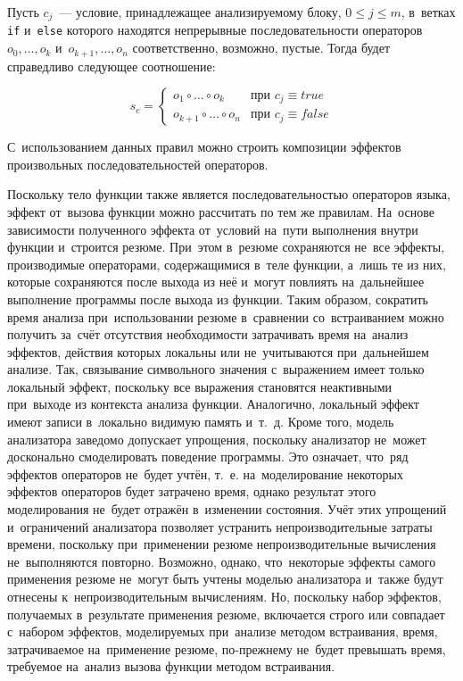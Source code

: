 Пусть $c_j$~--- условие, принадлежащее анализируемому блоку, $0 \leqslant j \leqslant m$, в~ветках \texttt{if} и~\texttt{else} которого находятся непрерывные последовательности операторов $o_0, \ldots, o_k$ и~$o_{k+1}, \ldots, o_n$ соответственно, возможно, пустые. Тогда будет справедливо следующее соотношение:

\begin{equation}
    s_c  =
     \left\{
    \begin{matrix}
    o_1 \circ \ldots \circ o_k & \text{при } c_j \equiv true \\
    o_{k+1} \circ \ldots \circ o_n & \text{при } c_j \equiv false
    \end{matrix} \right.
\end{equation}

С~использованием данных правил можно строить композиции эффектов произвольных последовательностей операторов.

Поскольку тело функции также является последовательностью операторов языка, эффект от~вызова функции можно рассчитать по тем же правилам. На~основе зависимости полученного эффекта от~условий на~пути выполнения внутри функции и~строится резюме. При~этом в~резюме сохраняются не~все эффекты, производимые операторами, содержащимися в~теле функции, а~лишь те из них, которые сохраняются после выхода из неё и~могут повлиять на~дальнейшее выполнение программы после выхода из функции. Таким образом, сократить время анализа при~использовании резюме в~сравнении со~встраиванием можно получить за~счёт отсутствия необходимости затрачивать время на~анализ эффектов, действия которых локальны или не~учитываются при~дальнейшем анализе. Так, связывание символьного значения с~выражением имеет только локальный эффект, поскольку все выражения становятся неактивными при~выходе из контекста анализа функции. Аналогично, локальный эффект имеют записи в~локально видимую память и~т.~д. Кроме того, модель анализатора заведомо допускает упрощения, поскольку анализатор не~может досконально смоделировать поведение программы. Это означает, что~ряд эффектов операторов не~будет учтён, т.~е. на~моделирование некоторых эффектов операторов будет затрачено время, однако результат этого моделирования не~будет отражён в~изменении состояния. Учёт этих упрощений и~ограничений анализатора позволяет устранить непроизводительные затраты времени, поскольку при~применении резюме непроизводительные вычисления не~выполняются повторно. Возможно, однако, что~некоторые эффекты самого применения резюме не~могут быть учтены моделью анализатора и~также будут отнесены к~непроизводительным вычислениям. Но, поскольку набор эффектов, получаемых в~результате применения резюме, включается строго или совпадает с~набором эффектов, моделируемых при~анализе методом встраивания, время, затрачиваемое на~применение резюме, по-прежнему не~будет превышать время, требуемое на~анализ вызова функции методом встраивания.



